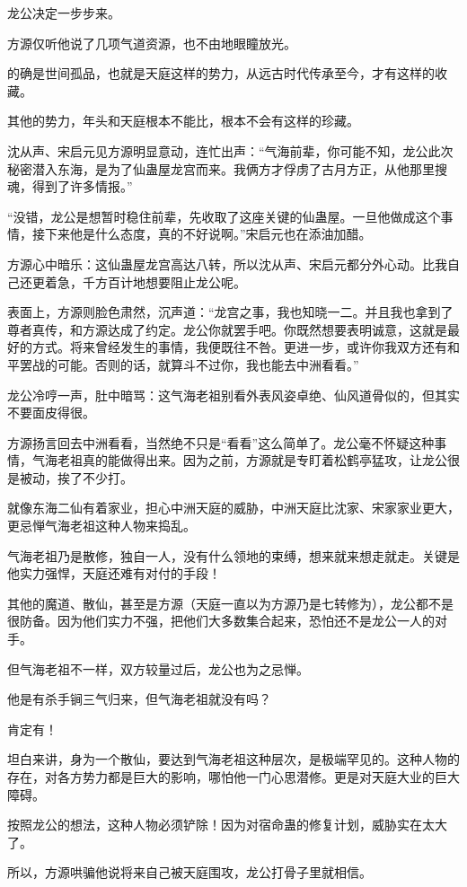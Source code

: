 \begin{this_body}
龙公决定一步步来。

方源仅听他说了几项气道资源，也不由地眼瞳放光。

的确是世间孤品，也就是天庭这样的势力，从远古时代传承至今，才有这样的收藏。

其他的势力，年头和天庭根本不能比，根本不会有这样的珍藏。

沈从声、宋启元见方源明显意动，连忙出声：“气海前辈，你可能不知，龙公此次秘密潜入东海，是为了仙蛊屋龙宫而来。我俩方才俘虏了古月方正，从他那里搜魂，得到了许多情报。”

“没错，龙公是想暂时稳住前辈，先收取了这座关键的仙蛊屋。一旦他做成这个事情，接下来他是什么态度，真的不好说啊。”宋启元也在添油加醋。

方源心中暗乐：这仙蛊屋龙宫高达八转，所以沈从声、宋启元都分外心动。比我自己还更着急，千方百计地想要阻止龙公呢。

表面上，方源则脸色肃然，沉声道：“龙宫之事，我也知晓一二。并且我也拿到了尊者真传，和方源达成了约定。龙公你就罢手吧。你既然想要表明诚意，这就是最好的方式。将来曾经发生的事情，我便既往不咎。更进一步，或许你我双方还有和平罢战的可能。否则的话，就算斗不过你，我也能去中洲看看。”

龙公冷哼一声，肚中暗骂：这气海老祖别看外表风姿卓绝、仙风道骨似的，但其实不要面皮得很。

方源扬言回去中洲看看，当然绝不只是“看看”这么简单了。龙公毫不怀疑这种事情，气海老祖真的能做得出来。因为之前，方源就是专盯着松鹤亭猛攻，让龙公很是被动，挨了不少打。

就像东海二仙有着家业，担心中洲天庭的威胁，中洲天庭比沈家、宋家家业更大，更忌惮气海老祖这种人物来捣乱。

气海老祖乃是散修，独自一人，没有什么领地的束缚，想来就来想走就走。关键是他实力强悍，天庭还难有对付的手段！

其他的魔道、散仙，甚至是方源（天庭一直以为方源乃是七转修为），龙公都不是很防备。因为他们实力不强，把他们大多数集合起来，恐怕还不是龙公一人的对手。

但气海老祖不一样，双方较量过后，龙公也为之忌惮。

他是有杀手锏三气归来，但气海老祖就没有吗？

肯定有！

坦白来讲，身为一个散仙，要达到气海老祖这种层次，是极端罕见的。这种人物的存在，对各方势力都是巨大的影响，哪怕他一门心思潜修。更是对天庭大业的巨大障碍。

按照龙公的想法，这种人物必须铲除！因为对宿命蛊的修复计划，威胁实在太大了。

所以，方源哄骗他说将来自己被天庭围攻，龙公打骨子里就相信。


\end{this_body}

